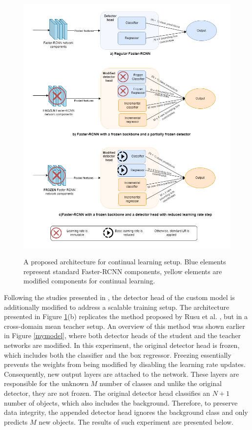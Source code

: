 \documentclass[english, 12pt, a4paper, elec, utf8, a-1b, online]{aaltothesis}
\begin{document}
\begin{figure}[htb]
	\begin{center}
		\includegraphics[width=16cm]{./FC.png}
	\end{center}
	\caption{A proposed architecture for continual learning setup. Blue elements represent standard Faster-RCNN components, yellow elements are modified components for continual learning.}
	\begin{center}
		\label{continualModel}
	\end{center}
\end{figure}
\FloatBarrier


Following the studies presented in , the detector head of the custom model is additionally modified to address a scalable training setup. The architecture presented in Figure \ref{continualModel}(b) replicates the method proposed by Rusu et al. \cite{Rusu2016}, but in a cross-domain mean teacher setup. An overview of this method was shown earlier in Figure \ref{mymodel}, where both detector heads of the student and the teacher networks are modified. In this experiment, the original detector head is frozen, which includes both the classifier and the box regressor. Freezing essentially prevents the weights from being modified by disabling the learning rate updates. Consequently, new output layers are attached to the network. These layers are responsible for the unknown $M$ number of classes and unlike the original detector, they are not frozen. The original detector head classifies an $N+1$ number of objects, which also includes the background. Therefore, to preserve data integrity, the appended detector head ignores the background class and only predicts $M$ new objects. The results of such experiment are presented below. 
\end{document}
